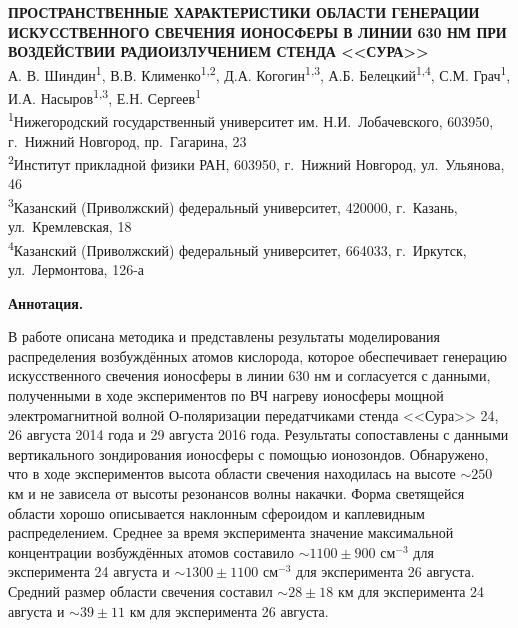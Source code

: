\documentclass[12pt,a4paper]{article}
\begin{document}

\begin{center}
	{\large\bf ПРОСТРАНСТВЕННЫЕ ХАРАКТЕРИСТИКИ ОБЛАСТИ ГЕНЕРАЦИИ ИСКУССТВЕННОГО СВЕЧЕНИЯ ИОНОСФЕРЫ В ЛИНИИ 630 НМ ПРИ ВОЗДЕЙСТВИИ РАДИОИЗЛУЧЕНИЕМ СТЕНДА <<СУРА>>}\\
	\vskip 0.5cm
	А. В. Шиндин\textsuperscript{1}, В.В. Клименко\textsuperscript{1,2}, Д.А. Когогин\textsuperscript{1,3}, А.Б. Белецкий\textsuperscript{1,4}, С.М. Грач\textsuperscript{1}, И.А. Насыров\textsuperscript{1,3}, Е.Н. Сергеев\textsuperscript{1}\\
	\vskip 0.5cm
	\textsuperscript{1}Нижегородский государственный университет им. Н.И.~Лобачевского,
	603950, г.~Нижний Новгород, пр.~Гагарина, 23\\
	\textsuperscript{2}Институт прикладной физики РАН,
	603950, г.~Нижний Новгород, ул.~Ульянова, 46\\
	\textsuperscript{3}Казанский (Приволжский) федеральный университет,
	420000, г.~Казань, ул.~Кремлевская, 18\\
	\textsuperscript{4}Казанский (Приволжский) федеральный университет,
	664033, г.~Иркутск, ул.~Лермонтова, 126-а\\
\end{center}
\thispagestyle{empty}
\textbf{Аннотация.}
 
В работе описана методика и представлены результаты моделирования распределения возбуждённых атомов кислорода, которое обеспечивает генерацию искусственного свечения ионосферы в линии 630 нм и согласуется с данными, полученными в ходе экспериментов по ВЧ нагреву ионосферы мощной электромагнитной волной О-поляризации передатчиками стенда <<Сура>> 24, 26 августа 2014 года и 29 августа 2016 года. Результаты сопоставлены с данными вертикального зондирования ионосферы с помощью ионозондов. Обнаружено, что в ходе экспериментов высота области свечения находилась на высоте $\sim250$ км и не зависела от высоты резонансов волны накачки. Форма светящейся области хорошо описывается наклонным сфероидом и каплевидным распределением. Среднее за время эксперимента значение максимальной концентрации возбуждённых атомов составило $\sim1100 \pm 900$ см$^{-3}$ для эксперимента 24 августа и  $\sim1300 \pm 1100$ см$^{-3}$ для эксперимента 26 августа. Средний размер области свечения составил $\sim28 \pm 18$ км для эксперимента 24 августа и $\sim39 \pm 11$ км для эксперимента 26 августа.\\
\end{document}
